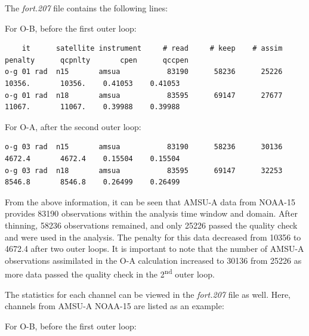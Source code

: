 The \textit{fort.207} file contains the following lines:

\hspace{4ex} For O-B, before the first outer loop:

\begin{scriptsize}
\begin{verbatim}
    it      satellite instrument     # read     # keep    # assim  penalty      qcpnlty       cpen      qccpen
o-g 01 rad  n15       amsua           83190      58236      25226    10356.       10356.    0.41053    0.41053
o-g 01 rad  n18       amsua           83595      69147      27677    11067.       11067.    0.39988    0.39988
\end{verbatim}
\end{scriptsize}

\hspace{4ex} For O-A, after the second outer loop:

\begin{scriptsize}
\begin{verbatim}
o-g 03 rad  n15       amsua           83190      58236      30136    4672.4       4672.4    0.15504    0.15504
o-g 03 rad  n18       amsua           83595      69147      32253    8546.8       8546.8    0.26499    0.26499
\end{verbatim}
\end{scriptsize}

From the above information, it can be seen that AMSU-A data from NOAA-15 provides 83190 observations within the analysis time window and domain.  After thinning, 58236 observations remained, and only 25226 passed the quality check and were used in the analysis.  The penalty for this data decreased from 10356 to 4672.4 after two outer loops. It is important to note that the number of AMSU-A observations assimilated in the O-A calculation increased to 30136 from 25226 as more data passed the quality check in the 2\textsuperscript{nd} outer loop.
 
The statistics for each channel can be viewed in the \textit{fort.207} file as well.  Here, channels from AMSU-A NOAA-15 are listed as an example:

\hspace{4ex} For O-B, before the first outer loop:

